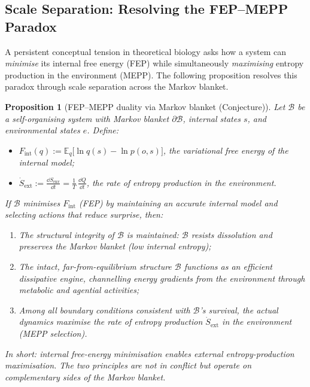 \documentclass[12pt,a4paper]{article}
\newtheorem{proposition}{Proposition}
\theoremstyle{remark}
\begin{document}
\subsection{Scale Separation: Resolving the FEP--MEPP Paradox}
\label{sec:fep-mepp-paradox}

A persistent conceptual tension in theoretical biology asks how a system
can \emph{minimise} its internal free energy (FEP) while simultaneously
\emph{maximising} entropy production in the environment (MEPP). The
following proposition resolves this paradox through scale separation
across the Markov blanket.

\begin{proposition}[FEP--MEPP duality via Markov blanket (Conjecture)]
\label{prop:fep-mepp}
Let $\mathcal{B}$ be a self-organising system with Markov blanket
$\partial\mathcal{B}$, internal states $s$, and environmental
states $e$. Define:
\begin{itemize}
  \item $F_{\mathrm{int}}(q) :=
    \mathbb{E}_{q}\!\bigl[\ln q(s) - \ln p(o, s)\bigr]$,
    the variational free energy of the internal model;
  \item $\dot{S}_{\mathrm{ext}} :=
    \frac{\dd S_{\mathrm{env}}}{\dd t} =
    \frac{1}{T}\,\frac{\dd Q}{\dd t}$,
    the rate of entropy production in the environment.
\end{itemize}
If $\mathcal{B}$ minimises $F_{\mathrm{int}}$ (FEP) by maintaining an
accurate internal model and selecting actions that reduce surprise, then:
\begin{enumerate}
  \item[\emph{(i)}] The structural integrity of $\mathcal{B}$ is
    maintained: $\mathcal{B}$ resists dissolution and preserves the
    Markov blanket (low internal entropy);
  \item[\emph{(ii)}] The intact, far-from-equilibrium structure
    $\mathcal{B}$ functions as an efficient dissipative engine,
    channelling energy gradients from the environment through
    metabolic and agential activities;
  \item[\emph{(iii)}] Among all boundary conditions consistent with
    $\mathcal{B}$'s survival, the actual dynamics maximise the rate
    of entropy production $\dot{S}_{\mathrm{ext}}$ in the environment
    (MEPP selection).
\end{enumerate}
In short: \emph{internal free-energy minimisation enables external
entropy-production maximisation}. The two principles are not in
conflict but operate on complementary sides of the Markov blanket.
\end{proposition}
\end{document}

